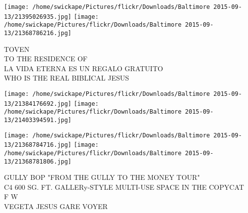 \documentclass[10pt,letterpaper]{article}
\begin{document}
\texttt{[image: /home/swickape/Pictures/flickr/Downloads/Baltimore 2015-09-13/21395026935.jpg]}
\texttt{[image: /home/swickape/Pictures/flickr/Downloads/Baltimore 2015-09-13/21368786216.jpg]}

TOVEN\\
TO THE RESIDENCE OF\\
LA VIDA ETERNA ES UN REGALO GRATUITO\\
WHO IS THE REAL BIBLICAL JESUS
\pagebreak

\texttt{[image: /home/swickape/Pictures/flickr/Downloads/Baltimore 2015-09-13/21384176692.jpg]}
\texttt{[image: /home/swickape/Pictures/flickr/Downloads/Baltimore 2015-09-13/21403394591.jpg]}

\texttt{[image: /home/swickape/Pictures/flickr/Downloads/Baltimore 2015-09-13/21368784716.jpg]}
\texttt{[image: /home/swickape/Pictures/flickr/Downloads/Baltimore 2015-09-13/21368781806.jpg]}

GULLY BOP "FROM THE GULLY TO THE MONEY TOUR"\\
C4 600 SG. FT. GALLERy{-}STYLE MULTI{-}USE SPACE IN THE COPYCAT\\
F W\\
VEGETA JESUS GARE VOYER
\pagebreak
\end{document}
